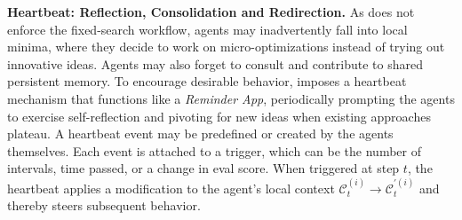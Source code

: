 

\textbf{Heartbeat: Reflection, Consolidation and Redirection.}
As \method{} does not enforce the fixed-search workflow, agents may inadvertently fall into local minima, where they decide to work on micro-optimizations instead of trying out innovative ideas. Agents may also forget to consult and contribute to shared persistent memory. To encourage desirable behavior, \method{} imposes a heartbeat mechanism that functions like a \textit{Reminder App}, periodically prompting the agents to exercise self-reflection and pivoting for new ideas when existing approaches plateau.
A heartbeat event may be predefined or created by the agents themselves. Each event is attached to a trigger, which can be the number of intervals, time passed, or a change in eval score.
When triggered at step $t$, the heartbeat applies a modification to the agent's local context $\mathcal{C}_t^{(i)} \rightarrow \mathcal{C}_t^{\prime (i)}$ and thereby steers subsequent behavior.

